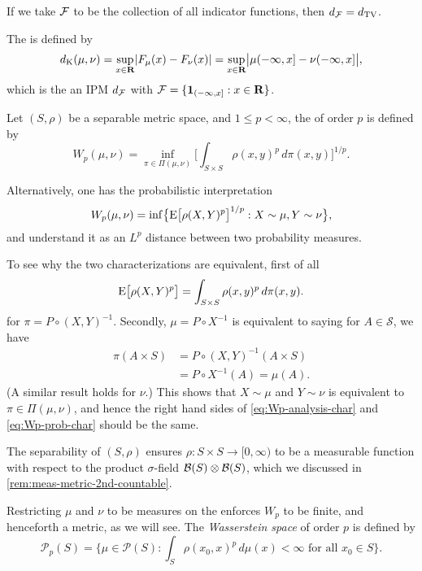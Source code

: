 If we take $\mathcal{F}$ to be the collection of all indicator functions, then $d_{\mathcal{F}} = d_{\mathrm{TV}}$.

The  is defined by \[
    d_{\mathrm{K}}(\mu,\nu) = \sup_{x\in \mathbf{R}} \lvert F_\mu(x) - F_\nu(x) \rvert = \sup_{x\in \mathbf{R}}\bigl\vert\mu(-\infty,x] - \nu(-\infty,x]\bigr\vert,
\] which is the an IPM $d_{\mathcal{F}}$ with $\mathcal{F} = \{\mathbf{1}_{(-\infty,x]} : x\in \mathbf{R}\}$.

Let $(S,\rho)$ be a separable metric space, and $1\leq p < \infty$, the  of order $p$ is defined by \begin{equation} \label{eq:Wp-analysis-char}
    W_p(\mu,\nu) = \inf_{\pi \in \Pi(\mu,\nu)} \biggl[\int_{S\times S} \rho(x,y)^p \,d\pi(x,y)\biggr]^{1/p}.
\end{equation}

Alternatively, one has the probabilistic interpretation \begin{equation} \label{eq:Wp-prob-char}
    W_p(\mu,\nu) = \inf\bigl\{\E \bigl[\rho(X,Y)^p\bigr]^{1/p} : X \sim \mu, Y \sim \nu\bigr\}, 
\end{equation} and understand it as an $L^p$ distance between two probability measures.

To see why the two characterizations are equivalent, first of all \[
    \mathop{}\!\mathrm{E} \bigl[\rho(X,Y)^p\bigr] = \int_{S\times S} \rho(x,y)^p \,d\pi(x,y).
\] for $\pi = P\circ (X, Y)^{-1}$. Secondly, $\mu = P \circ X^{-1}$ is equivalent to saying for $A\in \mathcal S$, we have \begin{align*}
    \pi(A \times S) & = P \circ (X,Y)^{-1}(A\times S)\\
    & = P\circ X^{-1}(A) = \mu(A).
\end{align*} (A similar result holds for $\nu$.) This shows that $X \sim \mu$ and $Y \sim \nu$ is equivalent to $\pi \in \Pi(\mu,\nu)$, and hence the right hand sides of \eqref{eq:Wp-analysis-char} and \eqref{eq:Wp-prob-char} should be the same.

The separability of $(S,\rho)$ ensures $\rho\colon S\times S \to [0,\infty)$ to be a measurable function with respect to the product $\sigma$-field $\mathcal{B}(S) \otimes \mathcal{B}(S)$, which we discussed in \cref{rem:meas-metric-2nd-countable}.

Restricting $\mu$ and $\nu$ to be measures on the  enforces $W_p$ to be finite, and henceforth a metric, as we will see. The \emph{Wasserstein space} of order $p$ is defined by \[
    \mathcal P_p(S) = \biggl\{\mu \in \mathcal{P}(S): \int_S \rho(x_0,x)^p \,{d}\mu(x) < \infty \text{ for all }x_0\in S\biggr\}.
\]

